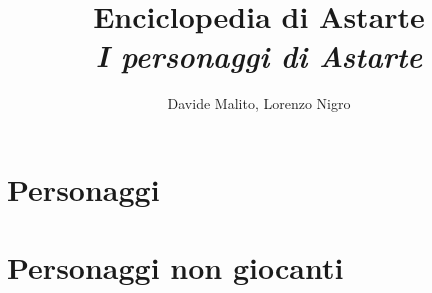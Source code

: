 \documentclass{book}
\author{Davide Malito, Lorenzo Nigro}
\title{Enciclopedia di Astarte \\ \small{\it{I personaggi di Astarte}}}
\begin{document}
\maketitle
\tableofcontents

\chapter{Personaggi}
\newpage

\chapter{Personaggi non giocanti}
\newpage
%
\end{document}
